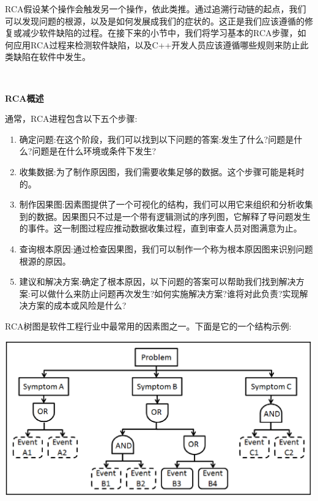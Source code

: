 RCA假设某个操作会触发另一个操作，依此类推。通过追溯行动链的起点，我们可以发现问题的根源，以及是如何发展成我们的症状的。这正是我们应该遵循的修复或减少软件缺陷的过程。在接下来的小节中，我们将学习基本的RCA步骤，如何应用RCA过程来检测软件缺陷，以及C++开发人员应该遵循哪些规则来防止此类缺陷在软件中发生。 \par

\noindent\textbf{}\ \par
\textbf{RCA概述} \ \par
通常，RCA进程包含以下五个步骤: \par

\begin{enumerate}
	\item 确定问题:在这个阶段，我们可以找到以下问题的答案:发生了什么?问题是什么?问题是在什么环境或条件下发生?
	\item 收集数据:为了制作原因图，我们需要收集足够的数据。这个步骤可能是耗时的。
	\item 制作因果图:因素图提供了一个可视化的结构，我们可以用它来组织和分析收集到的数据。因果图只不过是一个带有逻辑测试的序列图，它解释了导问题发生的事件。这一制图过程应推动数据收集过程，直到审查人员对图满意为止。
	\item 查询根本原因:通过检查因果图，我们可以制作一个称为根本原因图来识别问题根源的原因。
	\item 建议和解决方案:确定了根本原因，以下问题的答案可以帮助我们找到解决方案:可以做什么来防止问题再次发生?如何实施解决方案?谁将对此负责?实现解决方案的成本或风险是什么?
\end{enumerate}

RCA树图是软件工程行业中最常用的因素图之一。下面是它的一个结构示例: \par

\begin{center}
	\includegraphics[width=1.0\textwidth]{content/Section-2/Chapter-13/1}
\end{center}

